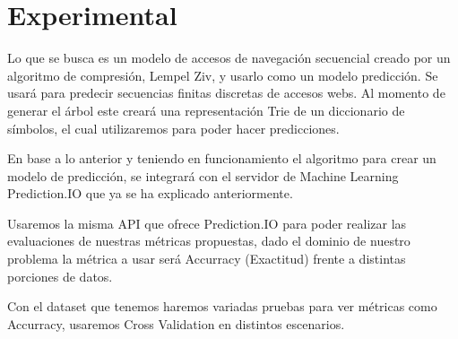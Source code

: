 \chapter[Experimental]{Experimental}





{
}

Lo que se busca es un modelo de accesos de navegación secuencial creado por un algoritmo de compresión, Lempel Ziv,  y usarlo como un modelo  predicción. Se usará para predecir secuencias finitas discretas de accesos webs. Al momento de generar el árbol este creará una representación Trie de un diccionario de símbolos, el cual utilizaremos para poder hacer predicciones.

En base a lo anterior y teniendo en funcionamiento el algoritmo para crear un modelo de predicción, se integrará con el servidor de Machine Learning Prediction.IO que ya se ha explicado anteriormente.



Usaremos la misma API que ofrece Prediction.IO para poder realizar las evaluaciones de nuestras métricas propuestas, dado el dominio de nuestro problema la métrica a usar será Accurracy (Exactitud) frente a distintas porciones de datos.



Con el dataset que tenemos haremos variadas pruebas para ver métricas como Accurracy, usaremos Cross Validation en distintos escenarios.


